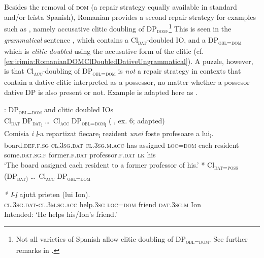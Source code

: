 \documentclass[output=paper,colorlinks,citecolor=brown,draft,draftmode]{langscibook}
\begin{document}
Besides the removal of \textsc{dom} (a repair strategy equally available in standard and/or leísta Spanish), Romanian provides a second repair strategy for examples such as , namely accusative clitic doubling of DP\textsubscript{\textsc{dom}}.\footnote{Not all varieties of Spanish allow clitic doubling of DP\textsubscript{\textsc{obl=dom}}. See further remarks in .} This is seen in the \textit{grammatical} sentence , which contains a Cl\textsubscript{\textsc{dat}}-doubled IO, and a DP\textsubscript{\textsc{obl=dom}} which is \textit{clitic doubled} using the accusative form of the clitic (cf. \ref{ex:irimia:RomanianDOMClDoubledDativeUngrammatical}). A puzzle, however, is that Cl\textsubscript{\textsc{acc}}-doubling of DP\textsubscript{\textsc{obl=dom}} is \textit{not} a repair strategy in contexts that contain a dative clitic interpreted as a possessor, no matter whether a possesor dative DP is also present or not. Example  is adapted here as .

: DP\textsubscript{\textsc{obl=dom}} and clitic doubled IOs \\
\ea {\Checkmark}  Cl\textsubscript{\textsc{dat}} DP\textsubscript{\textsc{dat}\textsubscript{i}} \ldots\, Cl\textsubscript{\textsc{acc}} DP\textsubscript{\textsc{obl=dom}\textsubscript{i}} \hfill (\citeauthor{cornil2020} \citeyear{cornil2020}, ex. 6; adapted) \\
{
\gll Comisia \textit{i} \ul{\textit{l}\textbf{}}-a repartizat  fiecare\textsubscript{i} rezident \textit{unei} foste profesoare a lui\textsubscript{i}. \\
board.\textsc{def.f.sg} \textsc{cl.3sg.dat} \textsc{cl.3sg.m.acc}-has assigned \textsc{loc=dom} each  resident some.\textsc{dat.sg.f} former.\textsc{f.dat} professor.\textsc{f.dat} \textsc{lk} his\\
\glt `The board assigned each  resident to a former professor of his.' \label{ex:irimia:ClDoubleDOMnoPCCwithClDoubleDat}
}
\ex \textsc{*} Cl\textsubscript{\textsc{dat=poss}} (DP\textsubscript{\textsc{dat)}} \ldots\, Cl\textsubscript{\textsc{acc}} DP\textsubscript{\textsc{obl=dom}} \\{
\gll \textit{* I}-\ul{\textit{l}} ajut\u a  prieten (lui Ion). \\
\textsc{cl.3sg.dat}-\textsc{cl.3m.sg.acc} help.\textsc{3sg} \textsc{loc=dom} friend \textsc{dat.3sg.m} Ion
\\
\glt Intended: `He helps his/Ion's friend.'  \label{ex:irimia:RomDOMUngramWithPossCliticRepeated}

}
\z
\z
\end{document}
